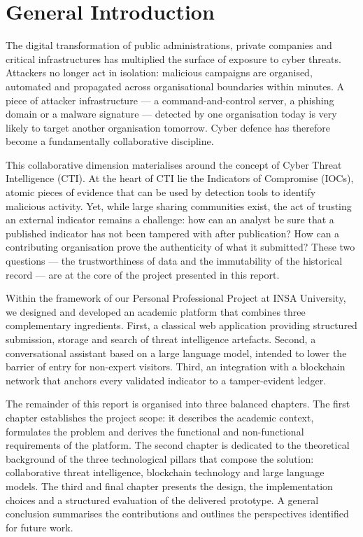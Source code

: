\documentclass[12pt,a4paper,oneside]{book}
\begin{document}
{{\mainmatter

\chapter*{General Introduction}

The digital transformation of public administrations, private companies and
critical infrastructures has multiplied the surface of exposure to cyber
threats. Attackers no longer act in isolation: malicious campaigns are
organised, automated and propagated across organisational boundaries within
minutes. A piece of attacker infrastructure --- a command-and-control server,
a phishing domain or a malware signature --- detected by one organisation
today is very likely to target another organisation tomorrow. Cyber defence
has therefore become a fundamentally collaborative discipline.

This collaborative dimension materialises around the concept of Cyber Threat
Intelligence (CTI). At the heart of CTI lie the Indicators of Compromise
(IOCs), atomic pieces of evidence that can be used by detection tools to
identify malicious activity. Yet, while large sharing communities exist, the
act of trusting an external indicator remains a challenge: how can an analyst
be sure that a published indicator has not been tampered with after
publication? How can a contributing organisation prove the authenticity of
what it submitted? These two questions --- the trustworthiness of data and
the immutability of the historical record --- are at the core of the project
presented in this report.

Within the framework of our Personal Professional Project at INSA University,
we designed and developed an academic platform that combines three
complementary ingredients. First, a classical web application providing
structured submission, storage and search of threat intelligence artefacts.
Second, a conversational assistant based on a large language model, intended
to lower the barrier of entry for non-expert visitors. Third, an integration
with a blockchain network that anchors every validated indicator to a
tamper-evident ledger.

The remainder of this report is organised into three balanced chapters. The
first chapter establishes the project scope: it describes the academic
context, formulates the problem and derives the functional and non-functional
requirements of the platform. The second chapter is dedicated to the
theoretical background of the three technological pillars that compose the
solution: collaborative threat intelligence, blockchain technology and
large language models. The third and final chapter presents the design,
the implementation choices and a structured evaluation of the delivered
prototype. A general conclusion summarises the contributions and outlines
the perspectives identified for future work.

}}
\end{document}

